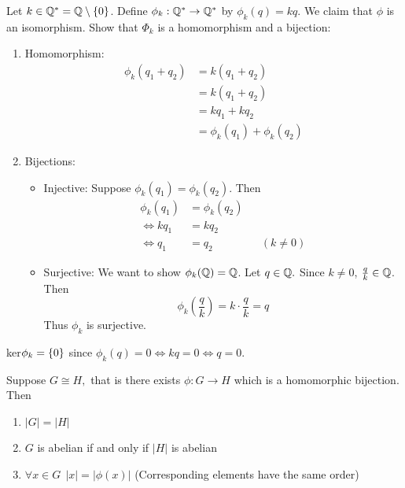 \begin{example}
    Let $k \in \mathbb{Q}^\ast = \mathbb{Q} \setminus \left\{0\right\}$. Define $\phi_k: \mathbb{Q}^\ast \to \mathbb{Q}^\ast$ by $\phi_k(q) = kq$. We claim that $\phi$ is an isomorphism.
    Show that $\Phi_k$ is a homomorphism and a bijection:
    \begin{enumerate}
        \item Homomorphism:
        \begin{align*}
            \phi_k(q_1 + q_2) &= k(q_1 +q_2) \\
            &= k (q_1+ q_2) \\
            &= kq_1 + kq_2 \\
            &= \phi_k(q_1) + \phi_k(q_2)
        \end{align*}
        \item Bijections:
        \begin{itemize}
            \item Injective: Suppose $\phi_k(q_1) = \phi_k(q_2)$. Then \begin{align*}
                \phi_k(q_1) &= \phi_k(q_2) \\ \iff
                kq_1 &= kq_2 \\ \iff
                q_1 &= q_2 &&(k \neq 0)
            \end{align*}
            \item Surjective: We want to show $\phi_k(\mathbb{Q}) = \mathbb{Q}$. Let $q \in \mathbb{Q}.$ Since $k \neq 0$, $\frac{q}{k} \in \mathbb{Q}$. Then
            $$\phi_k\left(\frac{q}{k}\right) = k \cdot \frac{q}{k} = q$$
            Thus $\phi_k$ is surjective.
        \end{itemize}
    \end{enumerate}
    ker$\phi_k=\left\{0\right\}$ since $\phi_k(q) = 0 \iff kq = 0 \iff q=0$.
\end{example}

\begin{fact}
    Suppose $G \cong H,$ that is there exists $\phi: G \to H$ which is a homomorphic bijection. Then
    \begin{enumerate}
        \item $|G|=|H|$
        \item $G$ is abelian if and only if $|H|$ is abelian
        \item $\forall x \in G ~~|x| = |\phi(x)|$ (Corresponding elements have the same order)
    \end{enumerate}
\end{fact}